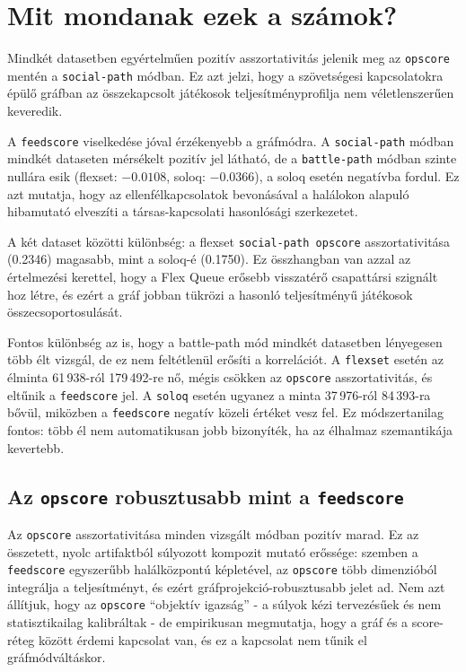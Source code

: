 ﻿\documentclass[a4paper,12pt]{report}
\begin{document}
\section{Mit mondanak ezek a számok?}

Mindkét datasetben egyértelműen pozitív asszortativitás jelenik meg az \texttt{opscore} mentén a \texttt{social-path} módban. Ez azt jelzi, hogy a szövetségesi kapcsolatokra épülő gráfban az összekapcsolt játékosok teljesítményprofilja nem véletlenszerűen keveredik.

A \texttt{feedscore} viselkedése jóval érzékenyebb a gráfmódra. A \texttt{social-path} módban mindkét dataseten mérsékelt pozitív jel látható, de a \texttt{battle-path} módban szinte nullára esik (flexset: $-0.0108$, soloq: $-0.0366$), a soloq esetén negatívba fordul. Ez azt mutatja, hogy az ellenfélkapcsolatok bevonásával a halálokon alapuló hibamutató elveszíti a társas-kapcsolati hasonlósági szerkezetet.

A két dataset közötti különbség: a flexset \texttt{social-path opscore} asszortativitása (0.2346) magasabb, mint a soloq-é (0.1750). Ez összhangban van azzal az értelmezési kerettel, hogy a Flex Queue erősebb visszatérő csapattársi szignált hoz létre, és ezért a gráf jobban tükrözi a hasonló teljesítményű játékosok összecsoportosulását.

Fontos különbség az is, hogy a battle-path mód mindkét datasetben lényegesen több élt vizsgál, de ez nem feltétlenül erősíti a korrelációt. A \texttt{flexset} esetén az élminta 61\,938-ról 179\,492-re nő, mégis csökken az \texttt{opscore} asszortativitás, és eltűnik a \texttt{feedscore} jel. A \texttt{soloq} esetén ugyanez a minta 37\,976-ról 84\,393-ra bővül, miközben a \texttt{feedscore} negatív közeli értéket vesz fel. Ez módszertanilag fontos: több él nem automatikusan jobb bizonyíték, ha az élhalmaz szemantikája kevertebb.

\subsection{Az \texttt{opscore} robusztusabb mint a \texttt{feedscore}}

Az \texttt{opscore} asszortativitása minden vizsgált módban pozitív marad. Ez az összetett, nyolc artifaktból súlyozott kompozit mutató erőssége: szemben a \texttt{feedscore} egyszerűbb halálközpontú képletével, az \texttt{opscore} több dimenzióból integrálja a teljesítményt, és ezért gráfprojekció-robusztusabb jelet ad. Nem azt állítjuk, hogy az \texttt{opscore} ``objektív igazság'' - a súlyok kézi tervezésűek és nem statisztikailag kalibráltak - de empirikusan megmutatja, hogy a gráf és a score-réteg között érdemi kapcsolat van, és ez a kapcsolat nem tűnik el gráfmódváltáskor.
\end{document}
